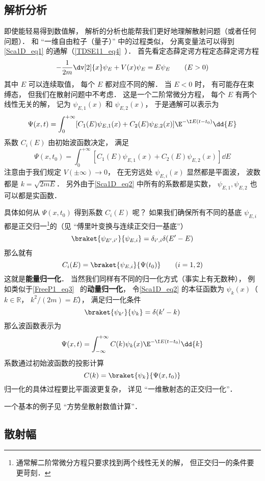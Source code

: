 \subsection{解析分析}
即使能轻易得到数值解， 解析的分析也能帮我们更好地理解散射问题（或者任何问题）． 和 “一维自由粒子（量子）” 中的过程类似， 分离变量法可以得到\autoref{Sca1D_eq1} 的通解（\autoref{TDSE11_eq4}~）． 首先看定态薛定谔方程定态薛定谔方程
\begin{equation}\label{Sca1D_eq2}
-\frac{1}{2m}\dv[2]{x}\psi_E + V(x) \psi_E = E \psi_E \qquad (E > 0)
\end{equation}
其中 $E$ 可以连续取值， 每个 $E$ 都对应不同的解． 当 $E< 0$ 时， 有可能存在束缚态， 但我们在散射问题中不考虑． 这是一个二阶常微分方程， 每个 $E$ 有两个线性无关的解， 记为 $\psi_{E,1}(x)$ 和 $\psi_{E,2}(x)$， 于是通解可以表示为
\begin{equation}
\Psi(x, t) = \int_0^{+\infty} [C_1(E) \psi_{E,1}(x) + C_2(E) \psi_{E,2}(x)] \E^{-\I E (t-t_0)} \dd{E}
\end{equation}
系数 $C_i(E)$ 由初始波函数决定， 满足
\begin{equation}
\Psi(x, t_0) = \int_0^{+\infty} [C_1(E) \psi_{E,1}(x) + C_2(E) \psi_{E,2}(x)] \dd{E}
\end{equation}
注意由于我们规定 $V(\pm\infty)\to 0$， 在无穷远处 $\psi_{E,i}(x)$ 显然都是平面波， 波数都是 $k = \sqrt{2mE}$． 另外由于\autoref{Sca1D_eq2} 中所有的系数都是实数， $\psi_{E,1}, \psi_{E,2}$ 也可以都是实函数．

具体如何从 $\Psi(x, t_0)$ 得到系数 $C_i(E)$ 呢？ 如果我们确保所有不同的基底 $\psi_{E,i}$ 都是正交归一\footnote{通常解二阶常微分方程只要求找到两个线性无关的解， 但正交归一的条件要更苛刻．}的（见 “傅里叶变换与连续正交归一基底”）
\begin{equation}
\braket{\psi_{E',i'}}{\psi_{E,i}} = \delta_{i',i}\delta(E' - E)
\end{equation}
那么就有
\begin{equation}
C_i(E) = \braket{\psi_{E,i}}{\Psi(t_0)} \qquad (i = 1,2)
\end{equation}
这就是\textbf{能量归一化}． 当然我们同样有不同的归一化方式（事实上有无数种）， 例如类似于\autoref{FreeP1_eq3}~ 的\textbf{动量归一化}， 令\autoref{Sca1D_eq2} 的本征函数为 $\psi_{k}(x)$（$k \in \mathbb R$， $k^2/(2m) = E$）， 满足归一化条件
\begin{equation}
\braket{\psi_{k'}}{\psi_{k}} = \delta(k' - k)
\end{equation}
那么波函数表示为
\begin{equation}\label{Sca1D_eq3}
\Psi(x, t) = \int_{-\infty}^{+\infty} C(k) \psi_k(x)\E^{-\I E (t-t_0)} \dd{k}
\end{equation}
系数通过初始波函数的投影计算
\begin{equation}
C(k) = \braket{\psi_k}{\Psi(x, t_0)}
\end{equation}
归一化的具体过程要比平面波更复杂， 详见 “一维散射态的正交归一化”．

一个基本的例子见 “方势垒散射数值计算”．

\subsection{散射幅}
